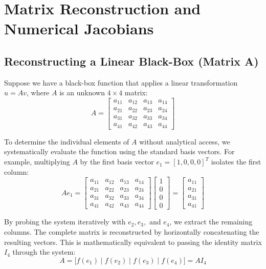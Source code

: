 \documentclass{article}
\begin{document}
\section{Matrix Reconstruction and Numerical Jacobians}

\subsection{Reconstructing a Linear Black-Box (Matrix A)}
Suppose we have a black-box function that applies a linear transformation $u = A v$, where $A$ is an unknown $4 \times 4$ matrix:
\begin{equation}
    A = \begin{bmatrix}
    a_{11} & a_{12} & a_{13} & a_{14} \\
    a_{21} & a_{22} & a_{23} & a_{24} \\
    a_{31} & a_{32} & a_{33} & a_{34} \\
    a_{41} & a_{42} & a_{43} & a_{44}
    \end{bmatrix}
\end{equation}

To determine the individual elements of $A$ without analytical access, we systematically evaluate the function using the standard basis vectors. For example, multiplying $A$ by the first basis vector $e_1 = [1, 0, 0, 0]^T$ isolates the first column:
\begin{equation}
    A e_1 = \begin{bmatrix}
    a_{11} & a_{12} & a_{13} & a_{14} \\
    a_{21} & a_{22} & a_{23} & a_{24} \\
    a_{31} & a_{32} & a_{33} & a_{34} \\
    a_{41} & a_{42} & a_{43} & a_{44}
    \end{bmatrix}
    \begin{bmatrix} 1 \\ 0 \\ 0 \\ 0 \end{bmatrix}
    = \begin{bmatrix} a_{11} \\ a_{21} \\ a_{31} \\ a_{41} \end{bmatrix}
\end{equation}

By probing the system iteratively with $e_2, e_3,$ and $e_4$, we extract the remaining columns. The complete matrix is reconstructed by horizontally concatenating the resulting vectors. This is mathematically equivalent to passing the identity matrix $I_4$ through the system:
\begin{equation}
    A = \Big[ f(e_1) \;\Big|\; f(e_2) \;\Big|\; f(e_3) \;\Big|\; f(e_4) \Big] = A I_4
\end{equation}
\end{document}
